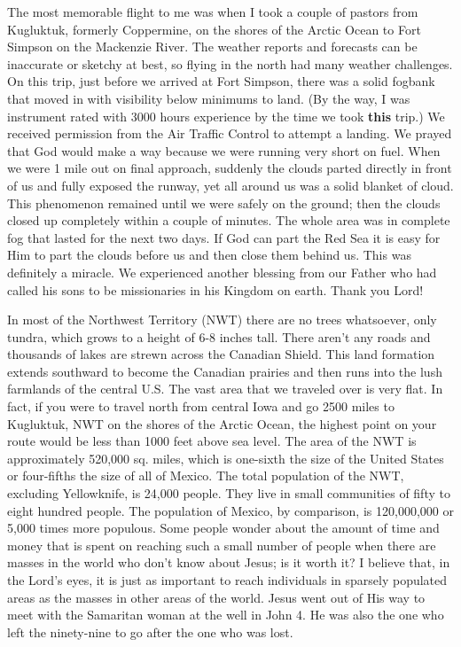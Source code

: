 \documentclass[twoside, 12pt]{book}
\begin{document}
The most memorable flight to me was when I took a couple of pastors from Kugluktuk, formerly Coppermine, on the shores of the Arctic Ocean to Fort Simpson on the Mackenzie River. The weather reports and forecasts can be inaccurate or sketchy at best, so flying in the north had many weather challenges. On this trip, just before we arrived at Fort Simpson, there was a solid fogbank that moved in with visibility below minimums to land. (By the way, I was instrument rated with 3000 hours experience by the time we took \textbf{this} trip.) We received permission from the Air Traffic Control to attempt a landing. We prayed that God would make a way because we were running very short on fuel. When we were 1 mile out on final approach, suddenly the clouds parted directly in front of us and fully exposed the runway, yet all around us was a solid blanket of cloud. This phenomenon remained until we were safely on the ground; then the clouds closed up completely within a couple of minutes. The whole area was in complete fog that lasted for the next two days. If God can part the Red Sea it is easy for Him to part the clouds before us and then close them behind us. This was definitely a miracle. We experienced another blessing from our Father who had called his sons to be missionaries in his Kingdom on earth. Thank you Lord!

In most of the Northwest Territory (NWT) there are no trees whatsoever, only tundra, which grows to a height of 6-8 inches tall. There aren't any roads and thousands of lakes are strewn across the Canadian Shield. This land formation extends southward to become the Canadian prairies and then runs into the lush farmlands of the central U.S. The vast area that we traveled over is very flat. In fact, if you were to travel north from central Iowa and go 2500 miles to Kugluktuk, NWT on the shores of the Arctic Ocean, the highest point on your route would be less than 1000 feet above sea level. The area of the NWT is approximately 520,000 sq. miles, which is one-sixth the size of the United States or four-fifths the size of all of Mexico. The total population of the NWT, excluding Yellowknife, is 24,000 people. They live in small communities of fifty to eight hundred people. The population of Mexico, by comparison, is 120,000,000 or 5,000 times more populous. Some people wonder about the amount of time and money that is spent on reaching such a small number of people when there are masses in the world who don't know about Jesus; is it worth it? I believe that, in the Lord's eyes, it is just as important to reach individuals in sparsely populated areas as the masses in other areas of the world. Jesus went out of His way to meet with the Samaritan woman at the well in John 4. He was also the one who left the ninety-nine to go after the one who was lost.
\end{document}
